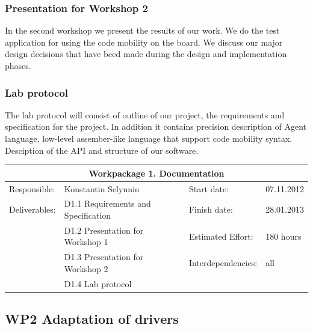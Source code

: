 \documentclass{scrreprt}
\begin{document}
	\subsubsection{Presentation for Workshop 2}

In the second workshop we present the results of our work.
We do the test application for using the code mobility on the board.
We discuss our major design decisions that have beed made during the design and implementation phases.

	\subsubsection{Lab protocol}

The lab protocol will consist of outline of our project, the requirements and specification for the project.
In addition it contains precision description of Agent language, low-level assember-like language that support code mobility syntax.
Desciption of the API and structure of our software.

\vspace{0.2in}
\begin{tabular}{|ll|ll|}
\hline \multicolumn{4}{|c|}{\textbf{Workpackage 1. Documentation}}\\
\hline
Responsible:	&  Konstantin Selyunin			& Start date:		& 07.11.2012 \\
Deliverables:	&  D1.1 Requirements and Specification  & Finish date:	 	& 28.01.2013\\
		&  D1.2 Presentation for Workshop 1	& Estimated Effort: 	& 180 hours \\
		&  D1.3 Presentation for Workshop 2	& Interdependencies:	& all	\\
		&  D1.4 Lab protocol			& 			& 	\\
\hline
\end{tabular}

	\subsection{WP2 Adaptation of drivers}
\end{document}
